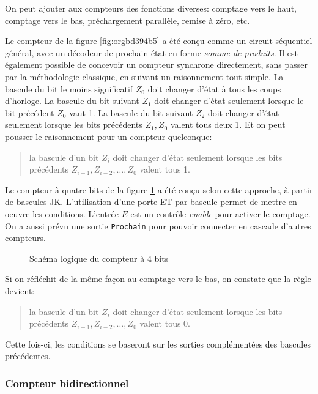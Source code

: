 \documentclass[11pt]{article}
\begin{document}
On peut ajouter aux compteurs des fonctions diverses: comptage vers le
haut, comptage vers le bas, préchargement parallèle, remise à zéro,
etc.

Le compteur de la figure \ref{fig:orgbd394b5} a été conçu comme un circuit
séquentiel général, avec un décodeur de prochain état en forme \emph{somme
de produits}. Il est également possible de concevoir un compteur
synchrone directement, sans passer par la méthodologie classique, en
suivant un raisonnement tout simple. La bascule du bit le moins
significatif \(Z_0\) doit changer d'état à tous les coups
d'horloge. La bascule du bit suivant \(Z_1\) doit changer d'état
seulement lorsque le bit précédent \(Z_0\) vaut 1. La bascule du bit
suivant \(Z_2\) doit changer d'état seulement lorsque les bits
précédents \(Z_1, Z_0\) valent tous deux 1. Et on peut pousser le
raisonnement pour un compteur quelconque: 
\begin{quote}
la bascule d'un bit \(Z_i\)
doit changer d'état seulement lorsque les bits précédents
\(Z_{i-1},Z_{i-2},\ldots, Z_0\) valent tous 1.
\end{quote}


Le compteur à quatre bits de la figure \ref{fig:orge21a46c} a été conçu
selon cette approche, à partir de bascules JK.  L'utilisation d'une
porte ET par bascule permet de mettre en oeuvre les
conditions. L'entrée \(E\) est un contrôle \emph{enable} pour activer le
comptage. On a aussi prévu une sortie \texttt{Prochain} pour pouvoir
connecter en cascade d'autres compteurs.

\begin{figure}[htbp]
\centering

\caption{\label{fig:orge21a46c}Schéma logique du compteur à 4 bits}
\end{figure}

Si on réfléchit de la même façon au comptage vers le bas, on constate
que la règle devient:

\begin{quote}
la bascule d'un bit \(Z_i\) doit changer d'état
seulement lorsque les bits précédents \(Z_{i-1},Z_{i-2},\ldots, Z_0\)
valent tous 0.
\end{quote}
Cette fois-ci, les conditions se baseront sur les sorties
complémentées des bascules précédentes.

\subsubsection{Compteur bidirectionnel}
\label{sec:org9e52d40}
\end{document}
